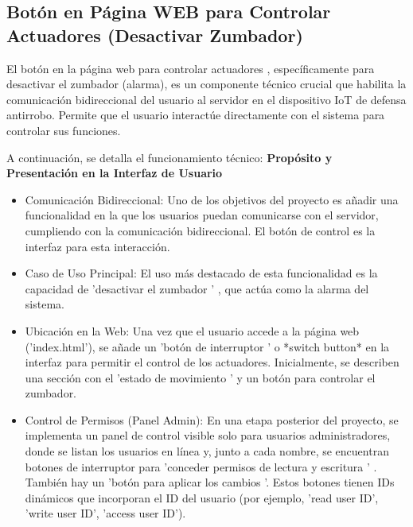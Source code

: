 \documentclass{report}
\begin{document}
\subsection{Botón en Página WEB para Controlar Actuadores (Desactivar Zumbador)}
El  botón en la página web para controlar actuadores , específicamente para  desactivar el zumbador  (alarma), es un componente técnico crucial que 
habilita la  comunicación bidireccional del usuario al servidor  en el dispositivo IoT de defensa antirrobo. Permite que el usuario interactúe directamente 
con el sistema para controlar sus funciones.

A continuación, se detalla el funcionamiento técnico:
\textbf{Propósito y Presentación en la Interfaz de Usuario}
\begin{itemize}
    \item Comunicación Bidireccional:  Uno de los objetivos del proyecto es añadir una funcionalidad en la que los usuarios puedan comunicarse con el 
    servidor, cumpliendo con la comunicación bidireccional. El botón de control es la interfaz para esta interacción.
    \item Caso de Uso Principal:  El uso más destacado de esta funcionalidad es la capacidad de   'desactivar el zumbador ' , que actúa como la alarma 
    del sistema.
    \item Ubicación en la Web:  Una vez que el usuario accede a la página web ('index.html'), se añade un  'botón de interruptor ' o *switch button* 
    en la interfaz para permitir el control de los actuadores. Inicialmente, se  describen una sección con el  'estado de movimiento ' y un botón 
    para controlar el zumbador.
    \item Control de Permisos (Panel Admin):  En una etapa posterior del proyecto, se implementa un panel de control visible solo para usuarios 
    administradores, donde se listan los usuarios en línea y, junto a cada nombre, se encuentran botones de interruptor para   'conceder permisos de 
    lectura y escritura ' . También hay un  'botón para aplicar los cambios '. Estos botones tienen IDs dinámicos que incorporan el ID del usuario 
    (por ejemplo, 'read user ID', 'write user ID', 'access user ID').
\end{itemize}
\end{document}
